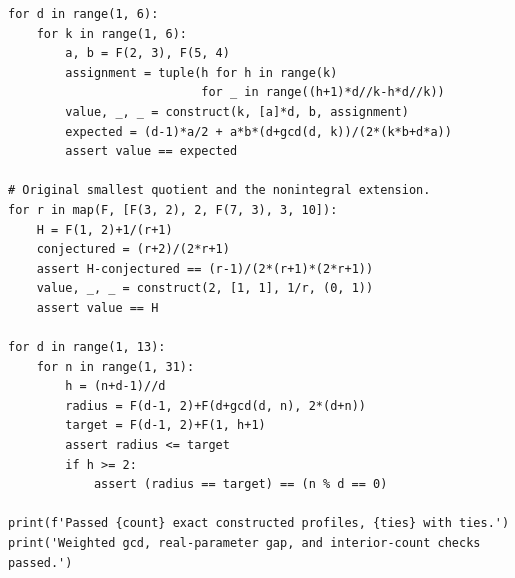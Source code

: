 \documentclass[11pt,a4paper]{article}
\theoremstyle{remark}\newtheorem{remark}[theorem]{Remark}
\begin{document}
\begin{Verbatim}[fontsize=\footnotesize,frame=single]
for d in range(1, 6):
    for k in range(1, 6):
        a, b = F(2, 3), F(5, 4)
        assignment = tuple(h for h in range(k)
                           for _ in range((h+1)*d//k-h*d//k))
        value, _, _ = construct(k, [a]*d, b, assignment)
        expected = (d-1)*a/2 + a*b*(d+gcd(d, k))/(2*(k*b+d*a))
        assert value == expected

# Original smallest quotient and the nonintegral extension.
for r in map(F, [F(3, 2), 2, F(7, 3), 3, 10]):
    H = F(1, 2)+1/(r+1)
    conjectured = (r+2)/(2*r+1)
    assert H-conjectured == (r-1)/(2*(r+1)*(2*r+1))
    value, _, _ = construct(2, [1, 1], 1/r, (0, 1))
    assert value == H

for d in range(1, 13):
    for n in range(1, 31):
        h = (n+d-1)//d
        radius = F(d-1, 2)+F(d+gcd(d, n), 2*(d+n))
        target = F(d-1, 2)+F(1, h+1)
        assert radius <= target
        if h >= 2:
            assert (radius == target) == (n % d == 0)

print(f'Passed {count} exact constructed profiles, {ties} with ties.')
print('Weighted gcd, real-parameter gap, and interior-count checks passed.')


\end{Verbatim}
\end{document}
